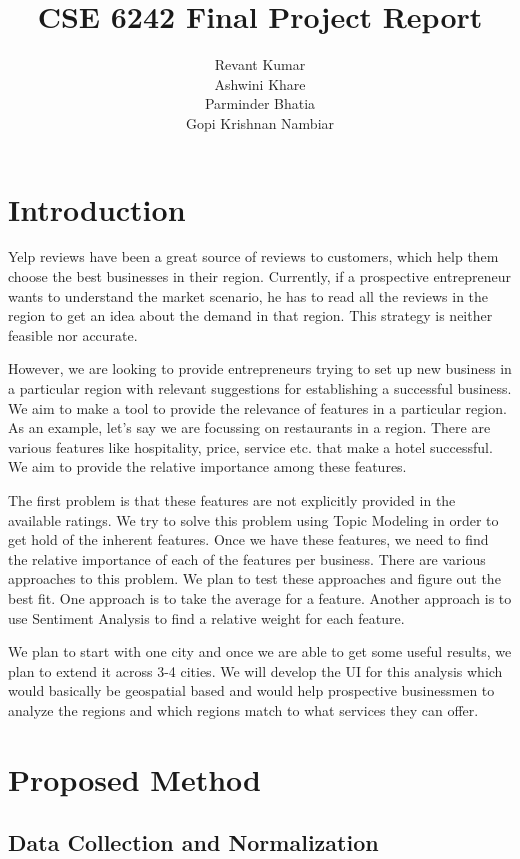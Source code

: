 \documentclass[12pt]{article} %
\title{CSE 6242 Final Project Report}
\author{
Revant Kumar\\
\And
Ashwini Khare\\
\And
Parminder Bhatia\\
\And
Gopi Krishnan Nambiar
}
\begin{document}
\maketitle

\section{Introduction}

Yelp reviews have been a great source of reviews to customers, which help them choose the best businesses in their region. Currently, if a prospective entrepreneur wants to understand the market scenario, he has to read all the reviews in the region to get an idea about the demand in that region. This strategy is neither feasible nor accurate. 

However, we are looking to provide entrepreneurs trying to set up new business in a particular region with relevant suggestions for establishing a successful business. We aim to make a tool to provide the relevance of features in a particular region. As an example, let's say we are focussing on restaurants in a region. There are various features like hospitality, price, service etc. that make a hotel successful. We aim to provide the relative importance among these features. 

The first problem is that these features are not explicitly provided in the available ratings. We try to solve this problem using Topic Modeling in order to get hold of the inherent features. Once we have these features, we need to find the relative importance of each of the features per business. There are various approaches to this problem. We plan to test these approaches and figure out the best fit. One approach is to take the average for a feature. Another approach is to use Sentiment Analysis to find a relative weight for each feature. 

We plan to start with one city and once we are able to get some useful results, we plan to extend it across 3-4 cities. We will develop the UI for this analysis which would basically be geospatial based and would help prospective businessmen to analyze the regions and which regions match to what services they can offer.

\section{Proposed Method}

\subsection{Data Collection and Normalization}
\end{document}
